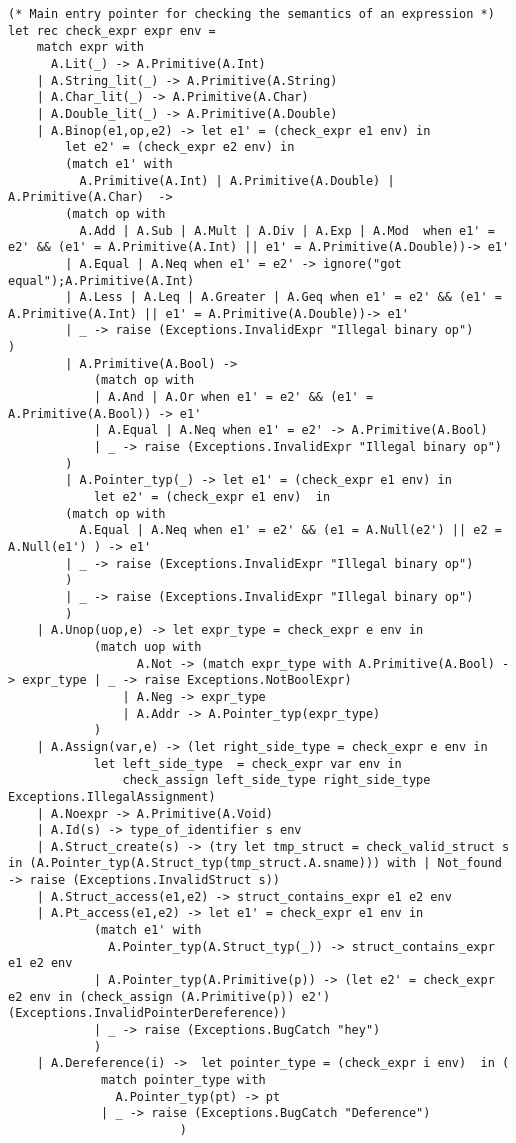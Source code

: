 \documentclass{article}
\begin{document}
\begin{lstlisting}
(* Main entry pointer for checking the semantics of an expression *)
let rec check_expr expr env =
	match expr with
	  A.Lit(_) -> A.Primitive(A.Int)
	| A.String_lit(_) -> A.Primitive(A.String)
	| A.Char_lit(_) -> A.Primitive(A.Char)
	| A.Double_lit(_) -> A.Primitive(A.Double)
	| A.Binop(e1,op,e2) -> let e1' = (check_expr e1 env) in 
		let e2' = (check_expr e2 env) in
		(match e1' with 
		  A.Primitive(A.Int) | A.Primitive(A.Double) | A.Primitive(A.Char)  -> 
		(match op with
		  A.Add | A.Sub | A.Mult | A.Div | A.Exp | A.Mod  when e1' = e2' && (e1' = A.Primitive(A.Int) || e1' = A.Primitive(A.Double))-> e1'
		| A.Equal | A.Neq when e1' = e2' -> ignore("got equal");A.Primitive(A.Int)
		| A.Less | A.Leq | A.Greater | A.Geq when e1' = e2' && (e1' = A.Primitive(A.Int) || e1' = A.Primitive(A.Double))-> e1'
		| _ -> raise (Exceptions.InvalidExpr "Illegal binary op") 
) 
		| A.Primitive(A.Bool) -> 		
			(match op with
			| A.And | A.Or when e1' = e2' && (e1' = A.Primitive(A.Bool)) -> e1'
			| A.Equal | A.Neq when e1' = e2' -> A.Primitive(A.Bool)
			| _ -> raise (Exceptions.InvalidExpr "Illegal binary op") 
		) 
		| A.Pointer_typ(_) -> let e1' = (check_expr e1 env) in 
			let e2' = (check_expr e1 env)  in  
		(match op with
		  A.Equal | A.Neq when e1' = e2' && (e1 = A.Null(e2') || e2 = A.Null(e1') ) -> e1'
		| _ -> raise (Exceptions.InvalidExpr "Illegal binary op") 
		)
		| _ -> raise (Exceptions.InvalidExpr "Illegal binary op") 
		) 
	| A.Unop(uop,e) -> let expr_type = check_expr e env in
			(match uop with
				  A.Not -> (match expr_type with A.Primitive(A.Bool) -> expr_type | _ -> raise Exceptions.NotBoolExpr) 
				| A.Neg -> expr_type
				| A.Addr -> A.Pointer_typ(expr_type)
			)
	| A.Assign(var,e) -> (let right_side_type = check_expr e env in 
			let left_side_type  = check_expr var env in
				check_assign left_side_type right_side_type Exceptions.IllegalAssignment)
	| A.Noexpr -> A.Primitive(A.Void)
	| A.Id(s) -> type_of_identifier s env 
	| A.Struct_create(s) -> (try let tmp_struct = check_valid_struct s in (A.Pointer_typ(A.Struct_typ(tmp_struct.A.sname))) with | Not_found -> raise (Exceptions.InvalidStruct s))
	| A.Struct_access(e1,e2) -> struct_contains_expr e1 e2 env
	| A.Pt_access(e1,e2) -> let e1' = check_expr e1 env in
			(match e1' with
			  A.Pointer_typ(A.Struct_typ(_)) -> struct_contains_expr e1 e2 env
			| A.Pointer_typ(A.Primitive(p)) -> (let e2' = check_expr e2 env in (check_assign (A.Primitive(p)) e2') (Exceptions.InvalidPointerDereference))
			| _ -> raise (Exceptions.BugCatch "hey")
			)
	| A.Dereference(i) ->  let pointer_type = (check_expr i env)  in (
			 match pointer_type with 
			   A.Pointer_typ(pt) -> pt
			 | _ -> raise (Exceptions.BugCatch "Deference") 
						)
				

\end{lstlisting}
\end{document}
